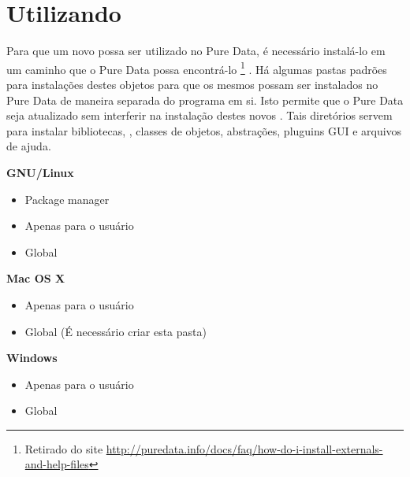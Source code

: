 \section{Utilizando \externals}
\label{sec:using}

Para que um novo \external possa ser utilizado no Pure Data, é necessário
instalá-lo em um caminho que o Pure Data possa encontrá-lo
\footnote{Retirado do site \url{http://puredata.info/docs/faq/how-do-i-install-externals-and-help-files}}
.
Há algumas pastas padrões para instalações destes objetos para que os
mesmos possam ser instalados no Pure Data de maneira separada do programa em si.
Isto permite que o Pure Data seja atualizado sem interferir na instalação destes
novos \externals.
Tais diretórios servem para instalar bibliotecas, \externals, classes de objetos,
abstrações, pluguins GUI e arquivos de ajuda.

\textbf{GNU/Linux}
\begin{itemize}
   \item Package manager 
   \item Apenas para o usuário 
   \item Global 
\end{itemize}

\textbf{Mac OS X}
\begin{itemize}
   \item Apenas para o usuário 
   \item Global  (É necessário criar esta pasta)
\end{itemize}

\textbf{Windows}
\begin{itemize}
   \item Apenas para o usuário 
   \item Global 
\end{itemize}

